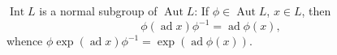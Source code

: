$\operatorname{Int} L$ is a normal subgroup of $\operatorname{Aut} L$: If $\phi \in \operatorname{Aut} L$, $x \in L$, then
$$\phi(\operatorname{ad} x)\phi^{-1} = \operatorname{ad} \phi(x),$$
whence $\phi \exp(\operatorname{ad} x)\phi^{-1} = \exp(\operatorname{ad} \phi(x))$.
